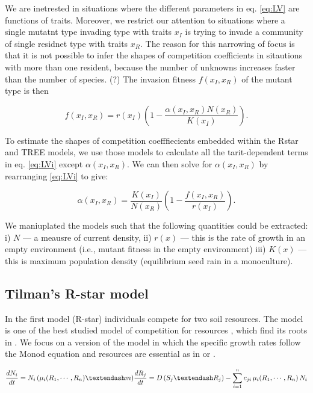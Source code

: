 \documentclass[a4paper,11pt]{article}
\begin{document}
We are inetrested in situations where the different parameters in eq.
\ref{eq:LV} are functions  of traits. Moreover, we restrict our
attention to situations where a single mutatnt type invading type with traits
$x_I$ is trying to invade a community of single residnet type with traits
$x_R$. The reason for this narrowing of focus is that it is not possible to
infer the shapes of competition coefficients in  sitautions with more than one
resident, because the number of unknowns increases faster than the number of
species. (?)  The invasion fitness $f(x_I, x_R)$ of the mutant type is then

\begin{equation}
  \label{eq:LVi}
   f(x_I, x_R) =
    r(x_I)\left(1 - \frac{\alpha(x_I, x_R) N(x_R)}{K(x_I)}\right).
\end{equation}

To estimate the shapes of competition coefffiecients
embedded within the Rstar and TREE models, we use those models to calculate all
the tarit-dependent terms in eq. \ref{eq:LVi} except $\alpha(x_I, x_R)$. We can
then solve for $\alpha(x_I, x_R)$ by rearranging  \ref{eq:LVi} to give:

\begin{equation}
  \label{eq:alpha}
 \alpha(x_I, x_R) = \frac{K(x_I)}{N(x_R)}
  \left(1 - \frac{f(x_I, x_R)}{r(x_I)}\right).
\end{equation}

We maniuplated the models
such that the following quantities
could be extracted: i) $N$ --- a meausre of current density, ii) $r(x)$ ---
this is the rate of growth in an empty environment (i.e., mutant fitness
in the empty environment) iii) $K(x)$ --- this is maximum population
density (equilibrium seed rain in a monoculture).


\subsection{Tilman's R-star model}

In the first model (R-star) individuals compete for two soil
resources. The model is one of the best studied model of competition
for resources \citep{Tilman-1982}, which find its roots in \citet{Leon-1975}. We focus on a version of the
model in which the specific growth rates follow the Monod
equation and resources are essential as in \citet{Tilman-1977} or \citet{Huisman-1999}.

\begin{equation}
\label{eq:R1}
\frac{dN_i}{dt} = N_i \, (\mu_i(R_1, \cdots,  R_n) – m) \\
\frac{dR_j}{dt} = D \, (S_j – R_j) - \sum_{i=1}^{n}{c_{ji} \,
  \mu_i(R_1, \cdots,  R_n) \, N_i}
\end{equation}
\end{document}
